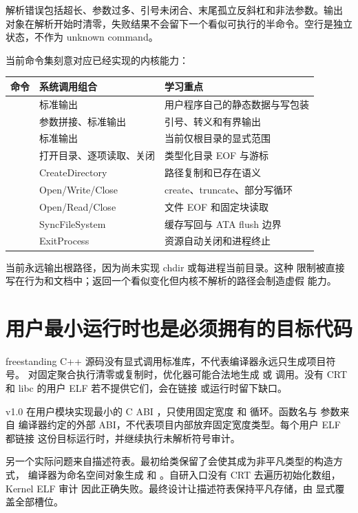 解析错误包括超长、参数过多、引号未闭合、末尾孤立反斜杠和非法参数。输出
对象在解析开始时清零，失败结果不会留下一个看似可执行的半命令。空行是独立
状态，不作为 unknown command。

当前命令集刻意对应已经实现的内核能力：

\begin{longtable}{L{0.20\textwidth}L{0.30\textwidth}L{0.34\textwidth}}
\toprule
命令 & 系统调用组合 & 学习重点\\
\midrule
{} & 标准输出 & 用户程序自己的静态数据与写包装\\
 & 参数拼接、标准输出 & 引号、转义和有界输出\\
 & 标准输出 & 当前仅根目录的显式范围\\
 & 打开目录、逐项读取、关闭 & 类型化目录 EOF 与游标\\
 & CreateDirectory & 路径复制和已存在语义\\
 & Open/Write/Close & create、truncate、部分写循环\\
 & Open/Read/Close & 文件 EOF 和固定块读取\\
 & SyncFileSystem & 缓存写回与 ATA flush 边界\\
 & ExitProcess & 资源自动关闭和进程终止\\
\bottomrule
\end{longtable}

 当前永远输出根路径，因为尚未实现 chdir 或每进程当前目录。这种
限制被直接写在行为和文档中；返回一个看似变化但内核不解析的路径会制造虚假
能力。

\section{用户最小运行时也是必须拥有的目标代码}

freestanding C++ 源码没有显式调用标准库，不代表编译器永远只生成项目符号。
对固定聚合执行清零或复制时，优化器可能合法地生成  或
 调用。没有 CRT 和 libc 的用户 ELF 若不提供它们，会在链接
或运行时留下缺口。

v1.0 在用户模块实现最小的 C ABI ，只使用固定宽度
 和  循环。函数名与  参数来自
编译器约定的外部 ABI，不代表项目内部放弃固定宽度类型。每个用户 ELF 都链接
这份目标运行时，并继续执行未解析符号审计。

另一个实际问题来自描述符表。最初给类保留了会使其成为非平凡类型的构造方式，
编译器为命名空间对象生成  和
。自研入口没有 CRT 去遍历初始化数组，Kernel ELF 审计
因此正确失败。最终设计让描述符表保持平凡存储，由
 显式覆盖全部槽位。

